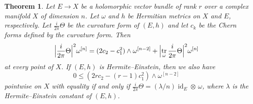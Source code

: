 \documentclass[11pt,a4paper]{amsart}
\def\^#1{^{[#1]}}
\DeclareMathOperator{\tr}{tr}
\DeclareMathOperator{\id}{id}
\def\curv{\frac{i}{2\pi} \Theta}
\newtheorem{theo}{Theorem}[section]
\theoremstyle{definition}
\theoremstyle{remark}
\numberwithin{equation}{section}
\begin{document}
\begin{theo}
    Let $E \to X$ be a holomorphic vector bundle of rank $r$ over a complex
manifold $X$ of dimension $n$. Let $\omega$ and $h$ be Hermitian metrics on
$X$ and $E$, respectively. Let $\curv$ be the curvature form of $(E,h)$
and let $c_k$ be the Chern forms defined by the curvature form. Then
$$
\Bigl\lvert \curv \Bigr\rvert^2 \omega\^n
= (2 c_2 - c_1^2) \wedge \omega\^{n-2}
+ \Bigl\lvert \tr_\omega \curv \Bigr\rvert^2 \omega\^n
$$
at every point of $X$. If $(E,h)$ is Hermite--Einstein, then we also have
$$
0 \leq 
(2r c_2 - (r-1) c_1^2) \wedge \omega\^{n-2}
$$
pointwise on $X$ with equality if and only if $\curv = (\lambda/n) \id_E
\otimes\, \omega$, where $\lambda$ is the Hermite--Einstein constant of
$(E,h)$.
\end{theo}
\end{document}
